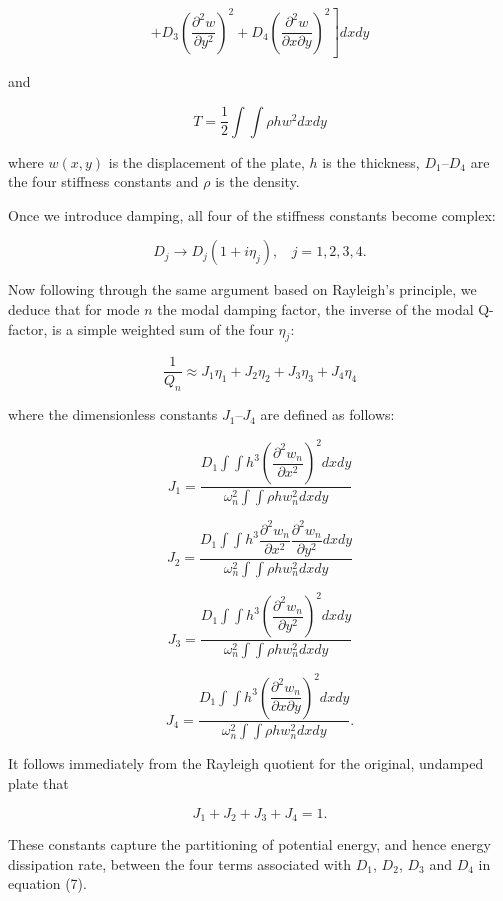   $$ \left. + D_3 \left(\dfrac{\partial^2 w}{\partial y^2} \right)^2 + D_4 
  \left(\dfrac{\partial^2 w}{\partial x \partial y} \right)^2 \right] dx dy 
  \tag{7}$$ 

  and 

  $$T=\dfrac{1}{2} \int{\int{ \rho h w^2 dx dy }} \tag{8}$$ 

  where $w(x,y)$ is the displacement of the plate, $h$ is the thickness, 
  $D_1$--$D_4$ are the four stiffness constants and $\rho$ is the density. 

  Once we introduce damping, all four of the stiffness constants become 
  complex: 

  $$D_j \rightarrow D_j(1+i \eta_j) \mathrm{,~~~~} j=1,2,3,4 . \tag{9}$$ 

  Now following through the same argument based on Rayleigh's principle, we 
  deduce that for mode $n$ the modal damping factor, the inverse of the modal 
  Q-factor, is a simple weighted sum of the four $\eta_j$: 

  $$\dfrac{1}{Q_n} \approx J_1 \eta_1 + J_2 \eta_2 + J_3 \eta_3 + J_4 \eta_4 
  \tag{10}$$ 

  where the dimensionless constants $J_1$--$J_4$ are defined as follows: 

  $$J_1 = \dfrac{D_1 \int{\int{h^3 \left(\dfrac{\partial^2 w_n}{\partial x^2} 
  \right)^2 dx dy }}}{\omega_n^2 \int{ \int{ \rho h w_n^2 dx dy }}} \tag{11}$$ 

  $$J_2 = \dfrac{D_1 \int{\int{h^3 \dfrac{\partial^2 w_n}{\partial x^2} 
  \dfrac{\partial^2 w_n}{\partial y^2} dx dy }}}{\omega_n^2 \int{ \int{ \rho h 
  w_n^2 dx dy }}} \tag{12}$$ 

  $$J_3 = \dfrac{D_1 \int{\int{h^3 \left(\dfrac{\partial^2 w_n}{\partial y^2} 
  \right)^2 dx dy }}}{\omega_n^2 \int{ \int{ \rho h w_n^2 dx dy }}} \tag{13}$$ 

  $$J_4 = \dfrac{D_1 \int{\int{h^3 \left(\dfrac{\partial^2 w_n}{\partial x 
  \partial y} \right)^2 dx dy }}}{\omega_n^2 \int{ \int{ \rho h w_n^2 dx dy }}} 
  . \tag{14}$$ 

  It follows immediately from the Rayleigh quotient for the original, undamped 
  plate that 

  $$J_1 + J_2 + J_3 + J_4 = 1 . \tag{15}$$ 

  These constants capture the partitioning of potential energy, and hence 
  energy dissipation rate, between the four terms associated with $D_1$, $D_2$, 
  $D_3$ and $D_4$ in equation (7). 


